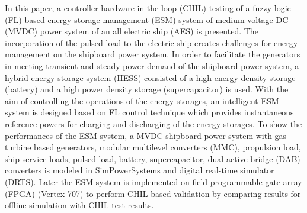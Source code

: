 In this paper, a controller hardware-in-the-loop (CHIL) testing of a fuzzy logic (FL) based energy storage management (ESM) system of medium voltage DC (MVDC) power system of an all electric ship (AES) is presented. The incorporation of the pulsed load to the electric ship creates challenges for energy management on the shipboard power system. In order to facilitate the generators in meeting transient and steady power demand of the shipboard power system, a hybrid energy storage system (HESS) consisted of a high energy density storage (battery) and a high power density storage (supercapacitor) is used. With the aim of controlling the operations of the energy storages, an intelligent ESM system is designed based on FL control technique which provides instantaneous reference powers for charging and discharging of the energy storages. To show the performances of the ESM system, a MVDC shipboard power system with gas turbine based generators, modular multilevel converters (MMC), propulsion load, ship service loads, pulsed load, battery, supercapacitor, dual active bridge (DAB) converters is modeled in SimPowerSystems and digital real-time simulator (DRTS). Later the ESM system is implemented on field programmable gate array (FPGA) (Vertex 707) to perform CHIL based validation by comparing results for offline simulation with CHIL test results. 
